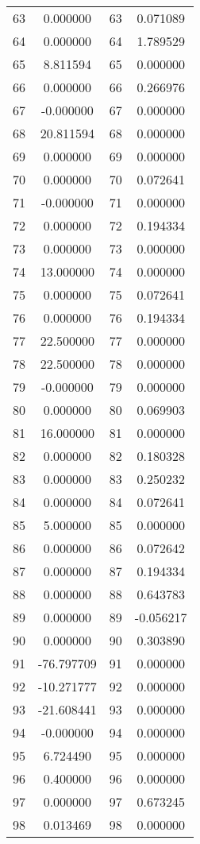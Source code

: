 \documentclass[12pt]{article}
\begin{document}
\begin{longtable}{@{}cccc@{}}
63 & 0.000000 & 63 & 0.071089 \\
64 & 0.000000 & 64 & 1.789529 \\
65 & 8.811594 & 65 & 0.000000 \\
66 & 0.000000 & 66 & 0.266976 \\
67 & -0.000000 & 67 & 0.000000 \\
68 & 20.811594 & 68 & 0.000000 \\
69 & 0.000000 & 69 & 0.000000 \\
70 & 0.000000 & 70 & 0.072641 \\
71 & -0.000000 & 71 & 0.000000 \\
72 & 0.000000 & 72 & 0.194334 \\
73 & 0.000000 & 73 & 0.000000 \\
74 & 13.000000 & 74 & 0.000000 \\
75 & 0.000000 & 75 & 0.072641 \\
76 & 0.000000 & 76 & 0.194334 \\
77 & 22.500000 & 77 & 0.000000 \\
78 & 22.500000 & 78 & 0.000000 \\
79 & -0.000000 & 79 & 0.000000 \\
80 & 0.000000 & 80 & 0.069903 \\
81 & 16.000000 & 81 & 0.000000 \\
82 & 0.000000 & 82 & 0.180328 \\
83 & 0.000000 & 83 & 0.250232 \\
84 & 0.000000 & 84 & 0.072641 \\
85 & 5.000000 & 85 & 0.000000 \\
86 & 0.000000 & 86 & 0.072642 \\
87 & 0.000000 & 87 & 0.194334 \\
88 & 0.000000 & 88 & 0.643783 \\
89 & 0.000000 & 89 & -0.056217 \\
90 & 0.000000 & 90 & 0.303890 \\
91 & -76.797709 & 91 & 0.000000 \\
92 & -10.271777 & 92 & 0.000000 \\
93 & -21.608441 & 93 & 0.000000 \\
94 & -0.000000 & 94 & 0.000000 \\
95 & 6.724490 & 95 & 0.000000 \\
96 & 0.400000 & 96 & 0.000000 \\
97 & 0.000000 & 97 & 0.673245 \\
98 & 0.013469 & 98 & 0.000000 \\

\end{longtable}
\end{document}
